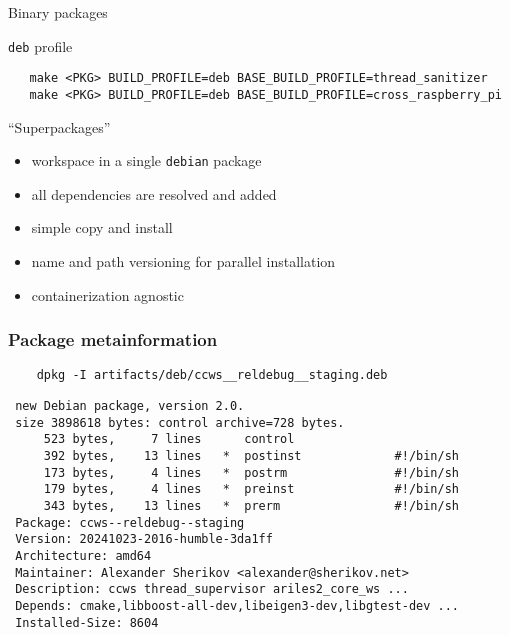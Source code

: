 \documentclass[hyperref={colorlinks=false, breaklinks=true},11pt]{beamer}
\begin{document}
\begin{frame}[fragile]{Binary packages}
    \begin{block}{\texttt{deb} profile}
\footnotesize{
\begin{verbatim}
   make <PKG> BUILD_PROFILE=deb BASE_BUILD_PROFILE=thread_sanitizer
   make <PKG> BUILD_PROFILE=deb BASE_BUILD_PROFILE=cross_raspberry_pi
\end{verbatim}
}
    \end{block}

    \begin{block}{``Superpackages''}
        \begin{itemize}
            \item workspace in a single \texttt{debian} package
            \item all dependencies are resolved and added
            \item simple copy and install
            \item name and path versioning for parallel installation
            \item containerization agnostic
        \end{itemize}
    \end{block}
\end{frame}


\begin{frame}[fragile]
    \frametitle{Package metainformation}
\begin{block}{}
\begin{verbatim}
    dpkg -I artifacts/deb/ccws__reldebug__staging.deb
\end{verbatim}
\end{block}
\small{
\begin{verbatim}
 new Debian package, version 2.0.
 size 3898618 bytes: control archive=728 bytes.
     523 bytes,     7 lines      control
     392 bytes,    13 lines   *  postinst             #!/bin/sh
     173 bytes,     4 lines   *  postrm               #!/bin/sh
     179 bytes,     4 lines   *  preinst              #!/bin/sh
     343 bytes,    13 lines   *  prerm                #!/bin/sh
 Package: ccws--reldebug--staging
 Version: 20241023-2016-humble-3da1ff
 Architecture: amd64
 Maintainer: Alexander Sherikov <alexander@sherikov.net>
 Description: ccws thread_supervisor ariles2_core_ws ...
 Depends: cmake,libboost-all-dev,libeigen3-dev,libgtest-dev ...
 Installed-Size: 8604
\end{verbatim}
}
\end{frame}
\end{document}
